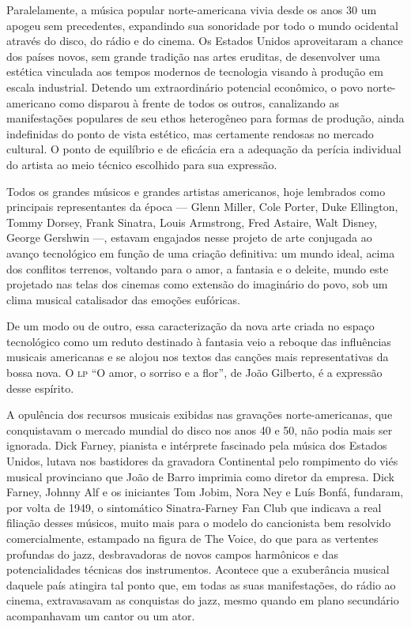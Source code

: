 Paralelamente, a música popular norte-americana vivia desde os anos 30
um apogeu sem precedentes, expandindo sua sonoridade por todo o mundo
ocidental através do disco, do rádio e do cinema. Os Estados Unidos
aproveitaram a chance dos países novos, sem grande tradição nas artes
eruditas, de desenvolver uma estética vinculada aos tempos modernos de
tecnologia visando à produção em escala industrial. Detendo um
extraordinário potencial econômico, o povo norte-americano como disparou
à frente de todos os outros, canalizando as manifestações populares de
seu ethos heterogêneo para formas de produção, ainda indefinidas do
ponto de vista estético, mas certamente rendosas no mercado cultural. O
ponto de equilíbrio e de eficácia era a adequação da perícia individual
do artista ao meio técnico escolhido para sua expressão.

Todos os grandes músicos e grandes artistas americanos, hoje lembrados
como principais representantes da época --- Glenn Miller, Cole Porter, Duke
Ellington, Tommy Dorsey, Frank Sinatra, Louis Armstrong, Fred Astaire,
Walt Disney, George Gershwin ---, estavam engajados nesse projeto de arte
conjugada ao avanço tecnológico em função de uma criação definitiva: um
mundo ideal, acima dos conflitos terrenos, voltando para o amor, a
fantasia e o deleite, mundo este projetado nas telas dos cinemas como
extensão do imaginário do povo, sob um clima musical catalisador das
emoções eufóricas.

De um modo ou de outro, essa caracterização da nova arte criada no
espaço tecnológico como um reduto destinado à fantasia veio a reboque
das influências musicais americanas e se alojou nos textos das canções
mais representativas da bossa nova. O \textsc{lp} ``O amor, o sorriso e a flor'', de
João Gilberto, é a expressão desse espírito.

A opulência dos recursos musicais exibidas nas gravações
norte-americanas, que conquistavam o mercado mundial do disco nos anos
40 e 50, não podia mais ser ignorada. Dick Farney, pianista e intérprete
fascinado pela música dos Estados Unidos, lutava nos bastidores da
gravadora Continental pelo rompimento do viés musical provinciano que
João de Barro imprimia como diretor da empresa. Dick Farney, Johnny Alf
e os iniciantes Tom Jobim, Nora Ney e Luís Bonfá, fundaram, por volta de
1949, o sintomático Sinatra-Farney Fan Club que indicava a real filiação
desses músicos, muito mais para o modelo do cancionista bem resolvido
comercialmente, estampado na figura de The Voice, do que para as
vertentes profundas do jazz, desbravadoras de novos campos harmônicos e
das potencialidades técnicas dos instrumentos. Acontece que a
exuberância musical daquele país atingira tal ponto que, em todas as
suas manifestações, do rádio ao cinema, extravasavam as conquistas do
jazz, mesmo quando em plano secundário acompanhavam um cantor ou um
ator.

